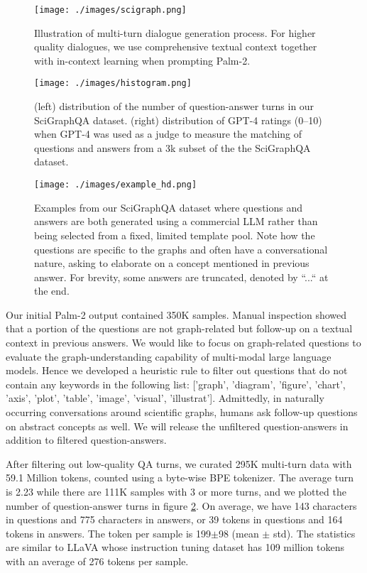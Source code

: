 \documentclass{article}
\begin{document}
\begin{figure}[!htbp]
\centering
\texttt{[image: ./images/scigraph.png]}
\caption{Illustration of multi-turn dialogue generation process. For higher quality dialogues, we use comprehensive textual context together with in-context learning when prompting Palm-2.}
\label{fig:questionanswer_generation_process_flow_palm2}
\end{figure}

\begin{figure}[!htbp]
\centering
\texttt{[image: ./images/histogram.png]}
\caption{(left) distribution of the number of question-answer turns in our SciGraphQA dataset. (right) distribution of GPT-4 ratings (0--10) when GPT-4 was used as a judge to measure the matching of questions and answers from a 3k subset of the the SciGraphQA dataset.}
\label{fig:gpt4_rating_distribution_histogram_gpt4}
\end{figure}

\begin{figure}[!htbp]
\centering
\texttt{[image: ./images/example\_hd.png]}
\caption{Examples from our SciGraphQA dataset where questions and answers are both generated using a commercial LLM rather than being selected from a fixed, limited template pool. Note how the questions are specific to the graphs and often have a conversational nature, asking to elaborate on a concept mentioned in previous answer. For brevity, some answers are truncated, denoted by ``...`` at the end.}
\label{fig:datasetexamples}
\end{figure}

Our initial Palm-2 output contained 350K samples. Manual inspection showed that a portion of the questions are not graph-related but follow-up on a textual context in previous answers. We would like to focus on graph-related questions to evaluate the graph-understanding capability of multi-modal large language models. Hence we developed a heuristic rule to filter out questions that do not contain any keywords in the following list: ['graph', 'diagram', 'figure', 'chart', 'axis', 'plot', 'table', 'image', 'visual', 'illustrat'].  Admittedly, in naturally occurring conversations around scientific graphs, humans ask follow-up questions on abstract concepts as well. We will release the unfiltered question-answers in addition to filtered question-answers. 

After filtering out low-quality QA turns, we curated 295K multi-turn data with 59.1 Million tokens, counted using a byte-wise BPE tokenizer. The average turn is 2.23 while there are 111K samples with 3 or more turns, and we plotted the number of question-answer turns in figure \ref{fig:gpt4_rating_distribution_histogram_gpt4}. On average, we have 143 characters in questions and 775 characters in answers, or 39 tokens in questions and 164 tokens in answers. The token per sample is 199$\pm$98 (mean $\pm$ std). The statistics are similar to LLaVA whose instruction tuning dataset has 109 million tokens with an average of 276 tokens per sample.
\end{document}
